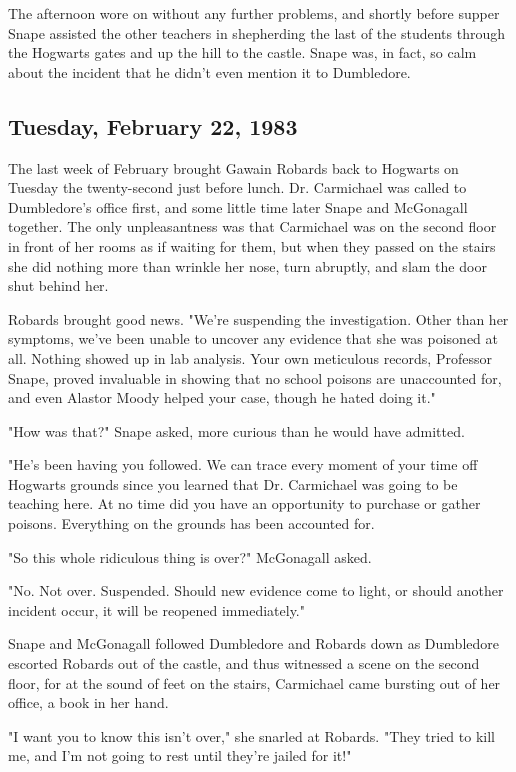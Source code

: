 \documentclass[a4paper,11pt]{article}
\begin{document}
The afternoon wore on without any further problems, and shortly before supper Snape assisted the other teachers in shepherding the last of the students through the Hogwarts gates and up the hill to the castle. Snape was, in fact, so calm about the incident that he didn't even mention it to Dumbledore.

\subsection{Tuesday, February 22, 1983}

The last week of February brought Gawain Robards back to Hogwarts on Tuesday the twenty-second just before lunch. Dr. Carmichael was called to Dumbledore's office first, and some little time later Snape and McGonagall together. The only unpleasantness was that Carmichael was on the second floor in front of her rooms as if waiting for them, but when they passed on the stairs she did nothing more than wrinkle her nose, turn abruptly, and slam the door shut behind her.

Robards brought good news. "We're suspending the investigation. Other than her symptoms, we've been unable to uncover any evidence that she was poisoned at all. Nothing showed up in lab analysis. Your own meticulous records, Professor Snape, proved invaluable in showing that no school poisons are unaccounted for, and even Alastor Moody helped your case, though he hated doing it."

"How was that?" Snape asked, more curious than he would have admitted.

"He's been having you followed. We can trace every moment of your time off Hogwarts grounds since you learned that Dr. Carmichael was going to be teaching here. At no time did you have an opportunity to purchase or gather poisons. Everything on the grounds has been accounted for.

"So this whole ridiculous thing is over?" McGonagall asked.

"No. Not over. Suspended. Should new evidence come to light, or should another incident occur, it will be reopened immediately."

Snape and McGonagall followed Dumbledore and Robards down as Dumbledore escorted Robards out of the castle, and thus witnessed a scene on the second floor, for at the sound of feet on the stairs, Carmichael came bursting out of her office, a book in her hand.

"I want you to know this isn't over," she snarled at Robards. "They tried to kill me, and I'm not going to rest until they're jailed for it!"
\end{document}
